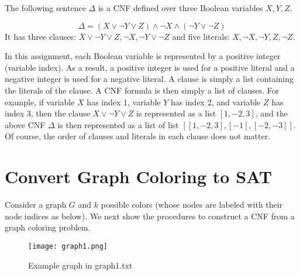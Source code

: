 \documentclass[10pt]{article}
\begin{document}
\begin{example}
The following sentence $\Delta$ is a CNF defined over three Boolean variables $X, Y, Z$.

\[
    \Delta = (X \lor \neg Y \lor Z) \land \neg X \land (\neg Y \lor \neg Z)
\]
It has three clauses: $X \lor \neg Y \lor Z, \neg X, \neg Y \lor \neg Z$ and five literals: $X, \neg X, \neg Y, Z, \neg Z$.
\end{example}
In this assignment, each Boolean variable is represented by a positive integer (variable index). As a result, a positive integer is used for a positive literal and a negative integer is used for a negative literal. A clause is simply a list containing the literals of the clause. A CNF formula is then simply a list of clauses. For example, if variable $X$ has index 1, variable $Y$ has index 2, and variable $Z$ has index 3, then the clause $X \lor \neg Y \lor Z$ is represented as a list $[1, -2, 3]$, and the above CNF $\Delta$ is then represented as a list of list $[[1, -2, 3],[-1],[-2,-3]]$. Of course, the order of clauses and literals in each clause does not matter.

\section{Convert Graph Coloring to SAT}
Consider a graph $G$ and $k$ possible colors (whose nodes are labeled with their node indices as below). We next show the procedures to construct a CNF from a graph coloring problem.

\begin{figure}[h]
    \centering
    \texttt{[image: graph1.png]}
    \caption{Example graph in graph1.txt}
    \label{fig:graph1}
\end{figure}
\end{document}
